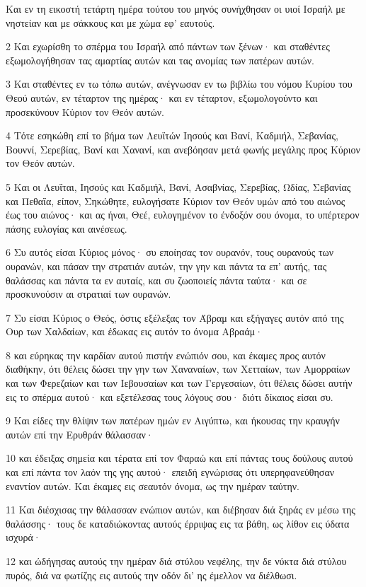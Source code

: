 \par Και εν τη εικοστή τετάρτη ημέρα τούτου του μηνός συνήχθησαν οι υιοί Ισραήλ με νηστείαν και με σάκκους και με χώμα εφ' εαυτούς.
\par 2 Και εχωρίσθη το σπέρμα του Ισραήλ από πάντων των ξένων· και σταθέντες εξωμολογήθησαν τας αμαρτίας αυτών και τας ανομίας των πατέρων αυτών.
\par 3 Και σταθέντες εν τω τόπω αυτών, ανέγνωσαν εν τω βιβλίω του νόμου Κυρίου του Θεού αυτών, εν τέταρτον της ημέρας· και εν τέταρτον, εξωμολογούντο και προσεκύνουν Κύριον τον Θεόν αυτών.
\par 4 Τότε εσηκώθη επί το βήμα των Λευϊτών Ιησούς και Βανί, Καδμιήλ, Σεβανίας, Βουννί, Σερεβίας, Βανί και Χανανί, και ανεβόησαν μετά φωνής μεγάλης προς Κύριον τον Θεόν αυτών.
\par 5 Και οι Λευΐται, Ιησούς και Καδμιήλ, Βανί, Ασαβνίας, Σερεβίας, Ωδίας, Σεβανίας και Πεθαΐα, είπον, Σηκώθητε, ευλογήσατε Κύριον τον Θεόν υμών από του αιώνος έως του αιώνος· και ας ήναι, Θεέ, ευλογημένον το ένδοξόν σου όνομα, το υπέρτερον πάσης ευλογίας και αινέσεως.
\par 6 Συ αυτός είσαι Κύριος μόνος· συ εποίησας τον ουρανόν, τους ουρανούς των ουρανών, και πάσαν την στρατιάν αυτών, την γην και πάντα τα επ' αυτής, τας θαλάσσας και πάντα τα εν αυταίς, και συ ζωοποιείς πάντα ταύτα· και σε προσκυνούσιν αι στρατιαί των ουρανών.
\par 7 Συ είσαι Κύριος ο Θεός, όστις εξέλεξας τον Άβραμ και εξήγαγες αυτόν από της Ουρ των Χαλδαίων, και έδωκας εις αυτόν το όνομα Αβραάμ·
\par 8 και εύρηκας την καρδίαν αυτού πιστήν ενώπιόν σου, και έκαμες προς αυτόν διαθήκην, ότι θέλεις δώσει την γην των Χαναναίων, των Χετταίων, των Αμορραίων και των Φερεζαίων και των Ιεβουσαίων και των Γεργεσαίων, ότι θέλεις δώσει αυτήν εις το σπέρμα αυτού· και εξετέλεσας τους λόγους σου· διότι δίκαιος είσαι συ.
\par 9 Και είδες την θλίψιν των πατέρων ημών εν Αιγύπτω, και ήκουσας την κραυγήν αυτών επί την Ερυθράν θάλασσαν·
\par 10 και έδειξας σημεία και τέρατα επί τον Φαραώ και επί πάντας τους δούλους αυτού και επί πάντα τον λαόν της γης αυτού· επειδή εγνώρισας ότι υπερηφανεύθησαν εναντίον αυτών. Και έκαμες εις σεαυτόν όνομα, ως την ημέραν ταύτην.
\par 11 Και διέσχισας την θάλασσαν ενώπιον αυτών, και διέβησαν διά ξηράς εν μέσω της θαλάσσης· τους δε καταδιώκοντας αυτούς έρριψας εις τα βάθη, ως λίθον εις ύδατα ισχυρά·
\par 12 και ώδήγησας αυτούς την ημέραν διά στύλου νεφέλης, την δε νύκτα διά στύλου πυρός, διά να φωτίζης εις αυτούς την οδόν δι' ης έμελλον να διέλθωσι.
